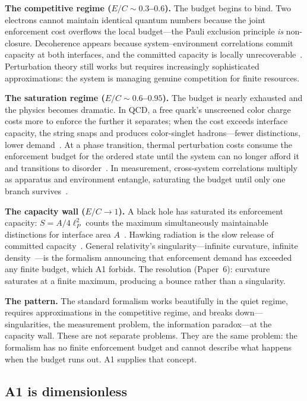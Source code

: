\documentclass[11pt]{article}
\begin{document}
\medskip\noindent\textbf{The competitive regime ($E/C \sim 0.3$--$0.6$).}
The budget begins to bind.  Two electrons cannot maintain identical quantum numbers because the joint enforcement cost overflows the local budget---the Pauli exclusion principle \emph{is} non-closure.  Decoherence appears because system--environment correlations commit capacity at both interfaces, and the committed capacity is locally unrecoverable~\cite{Zurek2003}.  Perturbation theory still works but requires increasingly sophisticated approximations: the system is managing genuine competition for finite resources.

\medskip\noindent\textbf{The saturation regime ($E/C \sim 0.6$--$0.95$).}
The budget is nearly exhausted and the physics becomes dramatic.  In QCD, a free quark's unscreened color charge costs more to enforce the further it separates; when the cost exceeds interface capacity, the string snaps and produces color-singlet hadrons---fewer distinctions, lower demand~\cite{Wilson1974}.  At a phase transition, thermal perturbation costs consume the enforcement budget for the ordered state until the system can no longer afford it and transitions to disorder~\cite{Wilson1983}.  In measurement, cross-system correlations multiply as apparatus and environment entangle, saturating the budget until only one branch survives~\cite{Zurek1981}.

\medskip\noindent\textbf{The capacity wall ($E/C \to 1$).}
A black hole has saturated its enforcement capacity: $S = A/4\ell_P^2$ counts the maximum simultaneously maintainable distinctions for interface area $A$~\cite{Bekenstein1981}.  Hawking radiation is the slow release of committed capacity~\cite{Hawking1975}.  General relativity's singularity---infinite curvature, infinite density~\cite{Penrose1965}---is the formalism announcing that enforcement demand has exceeded any finite budget, which A1 forbids.  The resolution (Paper~6): curvature saturates at a finite maximum, producing a bounce rather than a singularity.

\medskip\noindent\textbf{The pattern.}  The standard formalism works beautifully in the quiet regime, requires approximations in the competitive regime, and breaks down---singularities, the measurement problem, the information paradox---at the capacity wall.  These are not separate problems.  They are the same problem: the formalism has no finite enforcement budget and cannot describe what happens when the budget runs out.  A1 supplies that concept.


\subsection{A1 is dimensionless}
\end{document}
